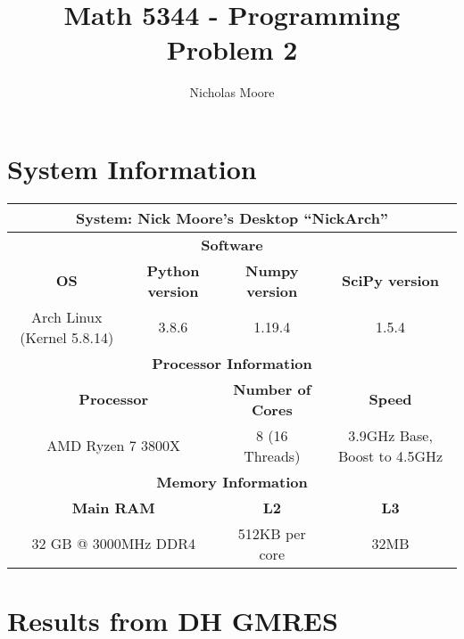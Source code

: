 \documentclass[oneside,final]{amsart}  %
\title{Math 5344 - Programming Problem 2}
\author{Nicholas Moore}
\begin{document}
\maketitle
\section{System Information}
  \begin{table}[htpb]
    \centering
    \begin{tabular}{|c|c|c|c|}
      \hline
      \multicolumn{4}{|c|}{\textbf{System: }Nick Moore's Desktop ``NickArch'' }\\
      \hline
      \hline
      \multicolumn{4}{|c|}{\textbf{Software}} \\
      \hline
      \textbf{OS} & \textbf{Python version} & \textbf{Numpy version} & \textbf{SciPy version} \\
      \hline
      Arch Linux (Kernel 5.8.14) & 3.8.6 & 1.19.4 & 1.5.4 \\
      \hline
      \multicolumn{4}{|c|}{\textbf{Processor Information}} \\
      \hline
      \multicolumn{2}{|c|}{\textbf{Processor}} & \textbf{Number of Cores} & \textbf{Speed} \\
      \hline
      \multicolumn{2}{|c|}{AMD Ryzen 7 3800X} & 8 (16 Threads) & 3.9GHz Base, Boost to 4.5GHz \\
      \hline
      \multicolumn{4}{|c|}{\textbf{Memory Information}} \\
      \hline
      \multicolumn{2}{|c|}{\textbf{Main RAM}} & \textbf{L2} & \textbf{L3} \\
      \hline
      \multicolumn{2}{|c|}{32 GB @ 3000MHz DDR4} & 512KB  per core & 32MB \\
      \hline
    \end{tabular}
  \end{table}
\section{Results from DH GMRES}
\end{document}
